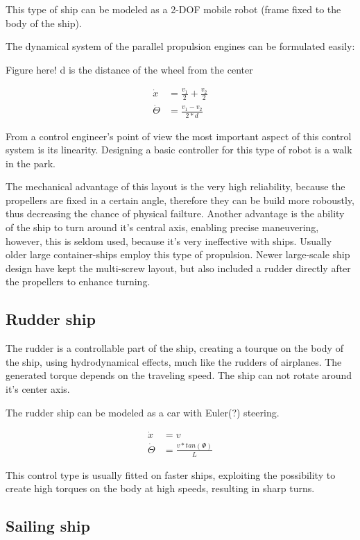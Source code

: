 This type of ship can be modeled as a 2-DOF mobile robot (frame fixed to the body of the ship).

The dynamical system of the parallel propulsion engines can be formulated easily:


Figure here! d is the distance of the wheel from the center

\begin{align}
	\dot{x} &= \frac{v_1}{2} + \frac{v_2}{2} \\
    \dot{\Theta} &= \frac{v_1-v_2}{2*d}
\end{align}

From a control engineer’s point of view the most important aspect of this control system is its linearity. Designing a basic controller for this type of robot is a walk in the park.

The mechanical advantage of this layout is the very high reliability, because the propellers are fixed in a certain angle, therefore they can be build more roboustly, thus decreasing the chance of physical failture. Another advantage is the ability of the ship to turn around it’s central axis, enabling precise maneuvering, however, this is seldom used, because it’s very ineffective with ships.
Usually older large container-ships employ this type of propulsion. Newer large-scale ship design have kept the multi-screw layout, but also included a rudder directly after the propellers to enhance turning.

\subsection{Rudder ship}

The rudder is a controllable part of the ship, creating a tourque on the body of the ship, using hydrodynamical effects, much like the rudders of airplanes. The generated torque depends on the traveling speed. The ship can not rotate around it’s center axis.

The rudder ship can be modeled as a car with Euler(?) steering.

\begin{align}
	\dot{x} &= v \\
	\dot{\Theta} &= \frac{v * tan(\Phi)}{L}
\end{align}

This control type is usually fitted on faster ships, exploiting the possibility to create high torques on the body at high speeds, resulting in sharp turns.

\subsection{Sailing ship}

